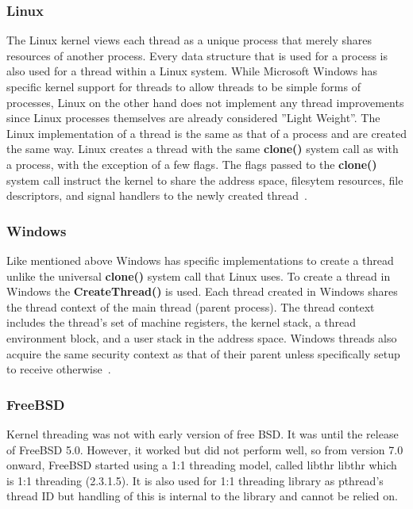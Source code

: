 \documentclass[10pt,draftclsnofoot,onecolumn,journal,compsoc]{IEEEtran}
\newcommand{\tab}{\hspace*{2em}} %
\begin{document}
\subsubsection*{Linux}
The Linux kernel views each thread as a unique process that merely shares resources of another process. Every data structure that is used for a process is also used for a thread within a Linux system. While Microsoft Windows has specific kernel support for threads to allow threads to be simple forms of processes, Linux on the other hand does not implement any thread improvements since Linux processes themselves are already considered ''Light Weight''. The Linux implementation of a thread is the same as that of a process and are created the same way. Linux creates a thread with the same \textbf{clone()} system call as with a process, with the exception of a few flags. The flags passed to the \textbf{clone()} system call instruct the kernel to share the address space, filesytem resources, file descriptors, and signal handlers to the newly created thread~\cite{Love}. 
\subsubsection*{Windows}
Like mentioned above Windows has specific implementations to create a thread unlike the universal \textbf{clone()} system call that Linux uses. To create a thread in Windows the \textbf{CreateThread()} is used. Each thread created in Windows shares the thread context of the main thread (parent process). The thread context includes the thread's set of machine registers, the kernel stack, a thread environment block, and a user stack in the address space. Windows threads also acquire the same security context as that of their parent unless specifically setup to receive otherwise~\cite{Wini}. 

\subsubsection*{FreeBSD}
\tab Kernel threading was not with early version of free BSD. It was until the release of FreeBSD 5.0. However, it worked but did not perform well, so from version 7.0 onward, FreeBSD started using a 1:1 threading model, called libthr libthr which is 1:1 threading \cite{freebsd.org}(2.3.1.5). It is also used for 1:1 threading library as pthread's thread ID but handling of this is internal to the library and cannot be relied on.

\newpage


\newpage
\end{document}
